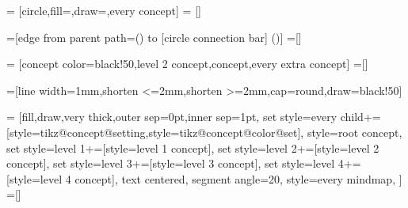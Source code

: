 

\def\tikz@compute@rotation{%
  \pgf@process{\pgfpointnormalised{\pgfpointdiff{\pgfpointanchor{\tikztostart}{center}}{\pgfpointanchor{\tikztotarget}{center}}}}%
  \pgf@ya=-\pgf@y%
  \edef\pgf@marshal{%
    \noexpand\pgfsetadditionalshadetransform{%
      \noexpand\pgftransformcm
      {\pgf@sys@tonumber{\pgf@x}}{\pgf@sys@tonumber{\pgf@y}}%
      {\pgf@sys@tonumber{\pgf@ya}}{\pgf@sys@tonumber{\pgf@x}}%
      {\noexpand\pgfpointorigin}%
    }%
  }%
  \pgf@marshal%
}





=          [circle,fill=\tikz@concept@color,draw=\tikz@concept@color,every concept]
=    []

\def\tikz@concept@color{black}

=[edge from parent path={(\tikzparentnode) to [circle connection bar] (\tikzchildnode)}]
=[]


=     [concept color=black!50,level 2 concept,concept,every extra concept]
=[]

=[line width=1mm,shorten <=2mm,shorten >=2mm,cap=round,draw=black!50]



=
  [fill,draw,very thick,outer sep=0pt,inner sep=1pt,%
   set style={{every child}+=[style=tikz@concept@setting,style=tikz@concept@color@set]},%
   style=root concept,
   set style={{level 1}+=[style=level 1 concept]},
   set style={{level 2}+=[style=level 2 concept]},
   set style={{level 3}+=[style=level 3 concept]},
   set style={{level 4}+=[style=level 4 concept]},
   text centered,%
   segment angle=20,
   style=every mindmap,
  ]
=[]


